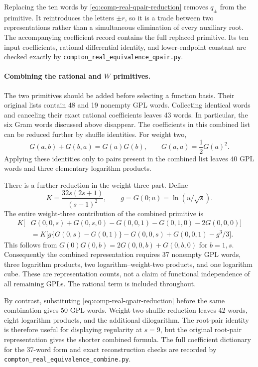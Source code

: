Replacing the ten words by \eqref{eq:comp-real-qpair-reduction} removes
$q_\pm$ from the primitive. It reintroduces the letters $\pm r$, so it
is a trade between two representations rather than a simultaneous
elimination of every auxiliary root. The accompanying coefficient
record contains the full replaced primitive. Its ten input coefficients,
rational differential identity, and lower-endpoint constant are checked
exactly by \texttt{compton\_real\_equivalence\_qpair.py}.

\paragraph{Combining the rational and $W$ primitives.}
The two primitives should be added before selecting a function basis.
Their original lists contain 48 and 19 nonempty GPL words. Collecting
identical words and canceling their exact rational coefficients leaves
43 words. In particular, the six Gram words discussed above disappear.
The coefficients in this combined list can be reduced further by shuffle
identities. For weight two,
\begin{equation}
 G(a,b)+G(b,a)=G(a)G(b),\qquad G(a,a)=\frac12G(a)^2.
\end{equation}
Applying these identities only to pairs present in the combined list leaves
40 GPL words and three elementary logarithm products.

There is a further reduction in the weight-three part. Define
\begin{equation}
 K=\frac{32s(2s+1)}{(s-1)^2},\qquad g=G(0;u)=\ln(u/\sqrt{s}).
\end{equation}
The entire weight-three contribution of the combined primitive is
\begin{align}
 K\bigl[&G(0,0,s)+G(0,s,0)-G(0,0,1)-G(0,1,0)
          -2G(0,0,0)\bigr]\\
 &=K\bigl[g\{G(0,s)-G(0,1)\}
          -G(0,0,s)+G(0,0,1)-g^3/3\bigr].
\end{align}
This follows from
$G(0)G(0,b)=2G(0,0,b)+G(0,b,0)$ for $b=1,s$.
Consequently the combined representation requires 37 nonempty GPL words,
three logarithm products, two logarithm--weight-two products, and one
logarithm cube. These are representation counts, not a claim of functional
independence of all remaining GPLs. The rational term is included throughout.

By contrast, substituting \eqref{eq:comp-real-qpair-reduction} before the
same combination gives 50 GPL words. Weight-two shuffle reduction leaves
42 words, eight logarithm products, and the additional dilogarithm.
The root-pair identity is therefore useful for displaying regularity at
$s=9$, but the original root-pair representation gives the shorter combined
formula. The full coefficient dictionary for the 37-word form and exact
reconstruction checks are recorded by
\texttt{compton\_real\_equivalence\_combine.py}.

